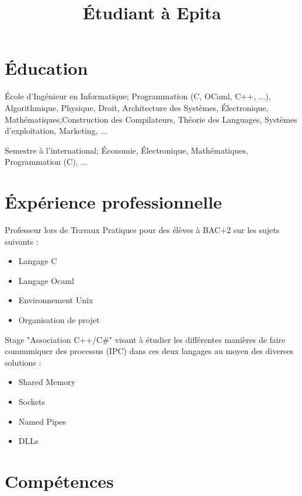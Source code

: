 \documentclass[11pt,a4paper]{moderncv}
\title{\'{E}tudiant à Epita}
\begin{document}
\makecvtitle

\section{\'{E}ducation}

{\'{E}cole d'Ingénieur en Informatique; Programmation (C, OCaml, C++, ...),
Algorithmique, Physique, Droit, Architecture des Systèmes, \'{E}lectronique,
Mathématiques,Construction des Compilateurs, Théorie des Languages, Systèmes
d'exploitation, Marketing, ... }

{Semestre à l'international; \'{E}conomie, \'{E}lectronique, Mathématiques,
    Programmation (C), ...}

{}

\section{\'{E}xpérience professionnelle}

{Professeur lors de Travaux Pratiques pour des élèves à BAC+2 sur les sujets suivants :
\begin{itemize}
    \item{Langage C}
    \item{Langage Ocaml}
    \item{Environnement Unix}
    \item{Organisation de projet}
\end{itemize}
}

{Stage "Association C++/C\#" visant à étudier les différentes manières de faire
    communiquer des processus (IPC) dans ces deux langages au moyen des
    diverses solutions :
\begin{itemize}
    \item{Shared Memory}
    \item{Sockets}
    \item{Named Pipes}
    \item{DLLs}
\end{itemize}
}

\section{Compétences}
\end{document}
